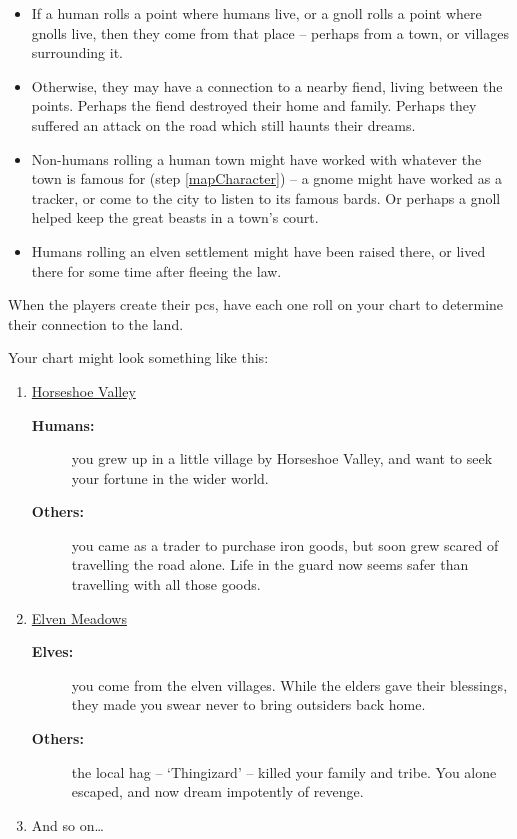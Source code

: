 \begin{multicols}{2}
\begin{itemize}
  \item
  If a human rolls a point where humans live, or a gnoll rolls a point where gnolls live, then they come from that place -- perhaps from a town, or \glspl{village} surrounding it.
  \item
  Otherwise, they may have a connection to a nearby fiend, living between the points.
  Perhaps the fiend destroyed their home and family.
  Perhaps they suffered an attack on the road which still haunts their dreams.
  \item
  Non-humans rolling a human town might have worked with whatever the town is famous for (step \vref{mapCharacter}) -- a gnome might have worked as a tracker, or come to the city to listen to its famous bards.
  Or perhaps a gnoll helped keep the great beasts in a town's \gls{court}.
  \item
  Humans rolling an elven settlement might have been raised there, or lived there for some time after fleeing the law.
\end{itemize}

When the players create their \glspl{pc}, have each one roll on your chart to determine their connection to the land.

\needspace{8em}
Your chart might look something like this:
\begin{enumerate}
  \item
  \underline{Horseshoe Valley}
  \begin{description}
    \item[\textbf{Humans:}] you grew up in a little \gls{village} by Horseshoe Valley, and want to seek your fortune in the wider world.
    \item[\textbf{Others:}] you came as a trader to purchase iron goods, but soon grew scared of travelling the road alone.
    Life in the \gls{guard} now seems safer than travelling with all those goods.
  \end{description}
  \item
  \underline{Elven Meadows}
  \begin{description}
    \item[\textbf{Elves:}]
    you come from the elven villages.
    While the elders gave their blessings, they made you swear never to bring outsiders back home.
    \item[\textbf{Others:}]
    the local hag -- `Thingizard' -- killed your family and tribe.
    You alone escaped, and now dream impotently of revenge.
  \end{description}
  \item
  And so on\ldots
\end{enumerate}

\end{multicols}

